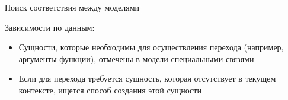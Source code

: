 \documentclass[12pt]{beamer}
\begin{document}
{
\begin{frame}{Поиск соответствия между моделями}
  \begin{mybox}[]
  Зависимости по данным:
  \begin{itemize}
    \item Сущности, которые необходимы для осуществления перехода (например, аргументы функции), отмечены в модели специальными связями
  	\item Если для перехода требуется сущность, которая отсутствует в текущем контексте, ищется способ создания этой сущности
  \end{itemize}
  \end{mybox}
\end{frame}
}
\end{document}
